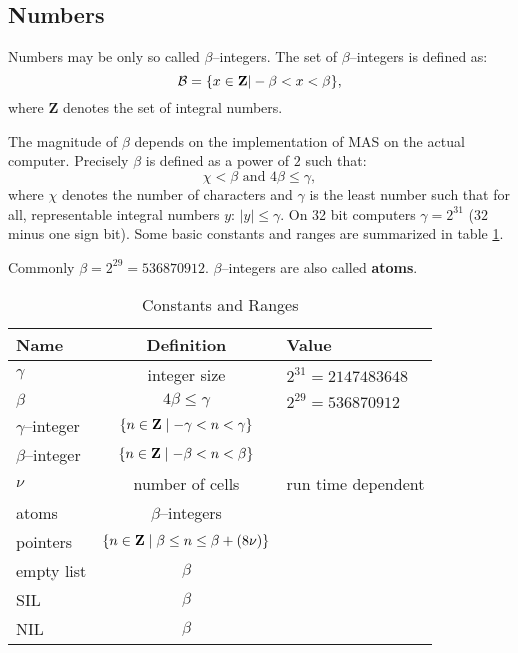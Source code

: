 \subsection{Numbers}

Numbers may be only so called $\beta$--integers. 
The set of $\beta$--integers is defined as:
\begin{displaymath} 
{\cal B} = \{ x \in {\bf Z} \vert -\beta < x < \beta \},
\end{displaymath} 
where {\bf Z} denotes the set of integral numbers.

{\small
The magnitude of $\beta$ depends on the  
implementation of MAS on the actual computer.
Precisely $\beta$ is defined as a power of $2$ 
such that: 
\begin{displaymath} 
       \chi < \beta \mbox{ and }
       4 \beta \leq \gamma,
\end{displaymath} 
where $\chi$ denotes the number of characters and
$\gamma$ is the least number such that for all, 
representable integral numbers $y$: $\vert y \vert \le \gamma$.
On 32 bit computers $\gamma = 2^{31}$ ($32$ minus one sign bit). 
Some basic constants and ranges are summarized in 
table \ref{tabCR}.
}

Commonly $\beta = 2^{29} = 536870912$.
$\beta$--integers are also called {\bf atoms}.

\begin{table}
\begin{center}
\begin{tabular}{|l|c|l|}
\hline
Name   & Definition & Value \\
\hline
$\gamma$          & integer size          & $2^{31} = 2 147 483 648 $ \\
$\beta$           & $4 \beta \leq \gamma$ & $2^{29} =   536 870 912 $ \\
$\gamma$--integer & $\{ n \in {\bf Z} \mid -\gamma < n < \gamma \}$ & \\
$\beta$--integer  & $\{ n \in {\bf Z} \mid -\beta < n < \beta \}$ & \\
$\nu$             & number of cells       & run time dependent \\
atoms             & $\beta$--integers     & \\
pointers          & $\{ n \in {\bf Z} \mid
                    \beta \leq n \leq \beta+(8 \nu) \}$ &\\
empty list        & $\beta$               & \\
SIL               & $\beta$               & \\
NIL               & $\beta$               & \\
\hline
\end{tabular}
\end{center}
\label{tabCR}
\caption{Constants and Ranges}
\end{table}

